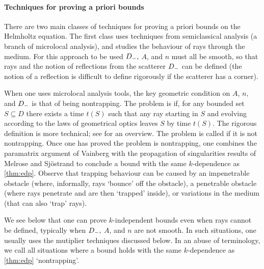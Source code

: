 \def\techtitle{Techniques for proving a priori bounds}
\paragraph{\techtitle} There are two main classes of techniques for proving a priori bounds on the Helmholtz equation. The first class uses techniques from semiclassical analysis (a branch of microlocal analysis), and studies the behaviour of rays through the medium. For this approach to be used $D_{-},$ $A$, and $n$ must all be smooth, so that rays and the notion of reflections from the scatterer $D_{-}$ can be defined (the notion of a reflection is difficult to define rigorously if the scatterer has a corner).

When one uses microlocal analysis tools, the key geometric condition on $A$, $n,$ and $D_{-}$ is that of being nontrapping. The problem is  if, for any bounded set $S \subseteq D$ there exists a time $t(S)$ such that any ray starting in $S$ and evolving according to the laws of geometrical optics leaves $S$ by time $t(S)$. The rigorous definition is more technical; see \cite[Section 6]{GrPeSp:19} for an overview. The problem is called  if it is not nontrapping. Once one has proved the problem is nontrapping, one combines the paramatrix argument of Vainberg \cite{Va:75} with the propagation of singularities results of Melrose and Sj\"ostrand \cite{MeSj:82} to conclude a bound with the same $k$-dependence as \cref{thm:edp}.  Observe that trapping behaviour can be caused by an impenetrable obstacle (where, informally, rays `bounce' off the obstacle), a penetrable obstacle (where rays penetrate and are then `trapped' inside), or variations in the medium (that can also `trap' rays).


We see below that one can prove $k$-independent bounds even when rays cannot be defined, typically when $D_{-},$ $A$, and $n$ are not smooth. In such situations, one usually uses the mutiplier techniques discussed below. In an abuse of terminology, we call all situations where a bound holds with the same $k$-dependence as \cref{thm:edp} `nontrapping'.\label{pg:informalnontrapping}


